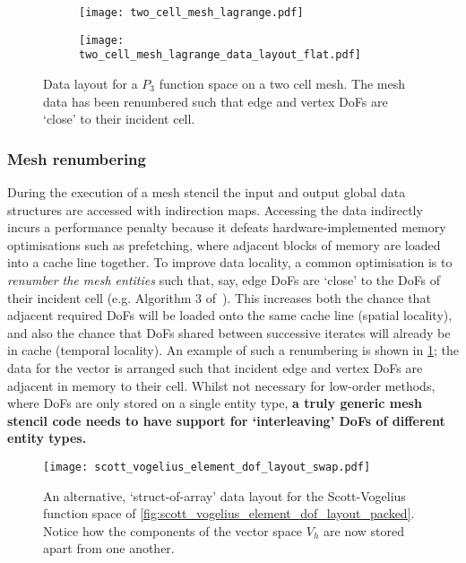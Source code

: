\documentclass[thesis]{subfiles}
\begin{document}
\begin{figure}
  \centering
  \begin{subfigure}{\textwidth}
    \centering
    \texttt{[image: two\_cell\_mesh\_lagrange.pdf]}
    \vspace{1em}
  \end{subfigure}
  \begin{subfigure}{\textwidth}
    \centering
    \texttt{[image: two\_cell\_mesh\_lagrange\_data\_layout\_flat.pdf]}
  \end{subfigure}
  \caption{
    Data layout for a $P_3$ function space on a two cell mesh.
    The mesh data has been renumbered such that edge and vertex DoFs are `close' to their incident cell.
  }
  \label{fig:mesh_renumbering_demo}
\end{figure}

\subsubsection{Mesh renumbering}

During the execution of a mesh stencil the input and output global data structures are accessed with indirection maps.
Accessing the data indirectly incurs a performance penalty because it defeats hardware-implemented memory optimisations such as prefetching, where adjacent blocks of memory are loaded into a cache line together.
To improve data locality, a common optimisation is to \textit{renumber the mesh entities} such that, say, edge DoFs are `close' to the DoFs of their incident cell (e.g. Algorithm 3 of~\cite{langeEfficientMeshManagement2016}).
This increases both the chance that adjacent required DoFs will be loaded onto the same cache line (spatial locality), and also the chance that DoFs shared between successive iterates will already be in cache (temporal locality).
An example of such a renumbering is shown in \cref{fig:mesh_renumbering_demo}; the data for the vector is arranged such that incident edge and vertex DoFs are adjacent in memory to their cell.
Whilst not necessary for low-order methods, where DoFs are only stored on a single entity type, \textbf{a truly generic mesh stencil code needs to have support for `interleaving' DoFs of different entity types.}

\begin{figure}
  \centering
  \texttt{[image: scott\_vogelius\_element\_dof\_layout\_swap.pdf]}
  \caption{
    An alternative, `struct-of-array' data layout for the Scott-Vogelius function space of \cref{fig:scott_vogelius_element_dof_layout_packed}.
    Notice how the components of the vector space $V_h$ are now stored apart from one another.
  }
  \label{fig:scott_vogelius_element_dof_layout_swap}
\end{figure}
\end{document}
